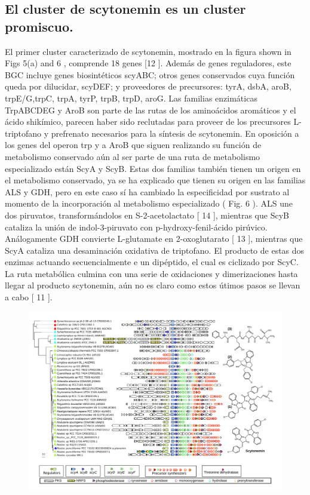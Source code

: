 \documentclass[12pt,twoside]{reedthesis}
\begin{document}
  \subsection{El cluster de scytonemin es un cluster
  promiscuo.}\label{el-cluster-de-scytonemin-es-un-cluster-promiscuo.}
  
  El primer cluster caracterizado de scytonemin, mostrado en la figura
  shown in Figs 5(a) and 6 , comprende 18 genes {[}12 {]}. Además de genes
  reguladores, este BGC incluye genes biosintéticos scyABC; otros genes
  conservados cuya función queda por dilucidar, scyDEF; y proveedores de
  precursores: tyrA, dsbA, aroB, trpE/G,trpC, trpA, tyrP, trpB, trpD,
  aroG. Las familias enzimáticas TrpABCDEG y AroB son parte de las rutas
  de los aminoácidos aromáticos y el ácido shikímico, parecen haber sido
  reclutadas para proveer de los precursores L-triptofano y prefrenato
  necesarios para la síntesis de scytonemin. En oposición a los genes del
  operon trp y a AroB que siguen realizando su función de metabolismo
  conservado aún al ser parte de una ruta de metabolismo especializado
  están ScyA y ScyB. Estas dos familias también tienen un origen en el
  metabolismo conservado, ya se ha explicado que tienen su origen en las
  familias ALS y GDH, pero en este caso sí ha cambiado la especificidad
  por sustrato al momento de la incorporación al metabolismo especializado
  ( Fig. 6 ). ALS une dos piruvatos, transformándolos en S-2-acetolactato
  {[} 14 {]}, mientras que ScyB cataliza la unión de indol-3-piruvato con
  p-hydroxy-fenil-ácido pirúvico. Análogamente GDH convierte L-glutamate
  en 2-oxoglutarato {[} 13 {]}, mientras que ScyA cataliza una
  desaminación oxidativa de triptofano. El producto de estas dos enzimas
  actuando secuencialmente e un dipéptido, el cual es ciclizado por ScyC.
  La ruta metabólica culmina con una serie de oxidaciones y dimerizaciones
  hasta llegar al producto scytonemin, aún no es claro como estos útimos
  pasos se llevan a cabo {[} 11 {]}.
  
  \begin{figure}[h!tbp]
  \centering
  \includegraphics[angle = 0,scale = .5]{chapter2/FigurasPaper/Figure7.pdf}
  \caption[EvoMining Algorithm]{\footnotesize{}}
  \label{fig:CorasonScytonemina}
  \end{figure}
  
\end{document}
